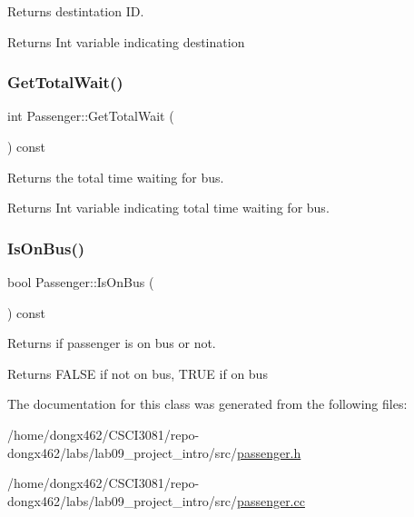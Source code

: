 Returns destintation ID. 

\begin{DoxyReturn}{Returns}
Int variable indicating destination 
\end{DoxyReturn}
\mbox{\label{classPassenger_a25158560f790ef7ef06d94c414b34f25}} 
\subsubsection{\texorpdfstring{Get\+Total\+Wait()}{GetTotalWait()}}
{\footnotesize\ttfamily int Passenger\+::\+Get\+Total\+Wait (\begin{DoxyParamCaption}{ }\end{DoxyParamCaption}) const}



Returns the total time waiting for bus. 

\begin{DoxyReturn}{Returns}
Int variable indicating total time waiting for bus. 
\end{DoxyReturn}
\mbox{\label{classPassenger_a2acf008ec444afcc859b914ee24add0e}} 
\subsubsection{\texorpdfstring{Is\+On\+Bus()}{IsOnBus()}}
{\footnotesize\ttfamily bool Passenger\+::\+Is\+On\+Bus (\begin{DoxyParamCaption}{ }\end{DoxyParamCaption}) const}



Returns if passenger is on bus or not. 

\begin{DoxyReturn}{Returns}
F\+A\+L\+SE if not on bus, T\+R\+UE if on bus 
\end{DoxyReturn}


The documentation for this class was generated from the following files\+:\begin{DoxyCompactItemize}
\item 
/home/dongx462/\+C\+S\+C\+I3081/repo-\/dongx462/labs/lab09\+\_\+project\+\_\+intro/src/\hyperlink{passenger_8h}{passenger.\+h}\item 
/home/dongx462/\+C\+S\+C\+I3081/repo-\/dongx462/labs/lab09\+\_\+project\+\_\+intro/src/\hyperlink{passenger_8cc}{passenger.\+cc}\end{DoxyCompactItemize}
